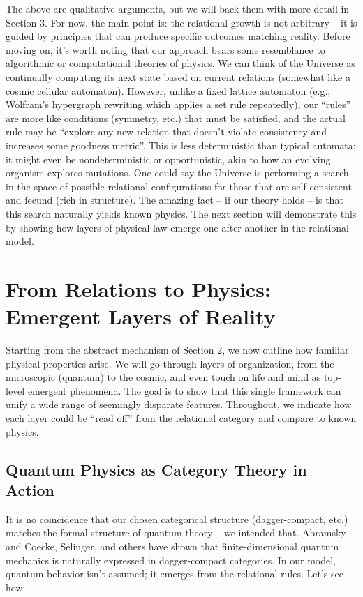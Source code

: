 \documentclass{article}
\begin{document}
The above are qualitative arguments, but we will back them with more detail in Section 3. For now, the main point is: the relational growth is not arbitrary – it is guided by principles that can produce specific outcomes matching reality. Before moving on, it’s worth noting that our approach bears some resemblance to algorithmic or computational theories of physics. We can think of the Universe as continually computing its next state based on current relations (somewhat like a cosmic cellular automaton). However, unlike a fixed lattice automaton (e.g., Wolfram’s hypergraph rewriting which applies a set rule repeatedly\cite{wolfram2020}), our “rules” are more like conditions (symmetry, etc.) that must be satisfied, and the actual rule may be “explore any new relation that doesn’t violate consistency and increases some goodness metric”. This is less deterministic than typical automata; it might even be nondeterministic or opportunistic, akin to how an evolving organism explores mutations. One could say the Universe is performing a search in the space of possible relational configurations for those that are self-consistent and fecund (rich in structure). The amazing fact – if our theory holds – is that this search naturally yields known physics. The next section will demonstrate this by showing how layers of physical law emerge one after another in the relational model.

\section{From Relations to Physics: Emergent Layers of Reality}

Starting from the abstract mechanism of Section 2, we now outline how familiar physical properties arise. We will go through layers of organization, from the microscopic (quantum) to the cosmic, and even touch on life and mind as top-level emergent phenomena. The goal is to show that this single framework can unify a wide range of seemingly disparate features. Throughout, we indicate how each layer could be “read off” from the relational category and compare to known physics.

\subsection{Quantum Physics as Category Theory in Action}

It is no coincidence that our chosen categorical structure (dagger-compact, etc.) matches the formal structure of quantum theory – we intended that. Abramsky and Coecke, Selinger, and others have shown that finite-dimensional quantum mechanics is naturally expressed in dagger-compact categories\cite{abramsky2009}. In our model, quantum behavior isn’t assumed; it emerges from the relational rules. Let’s see how:
\end{document}
